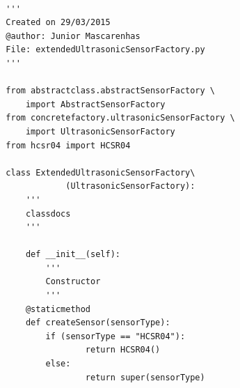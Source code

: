 \documentclass{acm_proc_article-sp}
\begin{document}
\renewcommand{\theFancyVerbLine}{
  \sffamily\textcolor[rgb]{0.5,0.5,0.5}{\scriptsize\arabic{FancyVerbLine}}}
\begin{verbatim}

  '''
  Created on 29/03/2015
  @author: Junior Mascarenhas
  File: extendedUltrasonicSensorFactory.py
  '''

  from abstractclass.abstractSensorFactory \
      import AbstractSensorFactory
  from concretefactory.ultrasonicSensorFactory \
      import UltrasonicSensorFactory
  from hcsr04 import HCSR04

  class ExtendedUltrasonicSensorFactory\
              (UltrasonicSensorFactory):
      '''
      classdocs
      '''

      def __init__(self):
          '''
          Constructor
          '''
      @staticmethod
      def createSensor(sensorType):
          if (sensorType == "HCSR04"):
                  return HCSR04()
          else:
                  return super(sensorType)
\end{verbatim}


\end{document}
